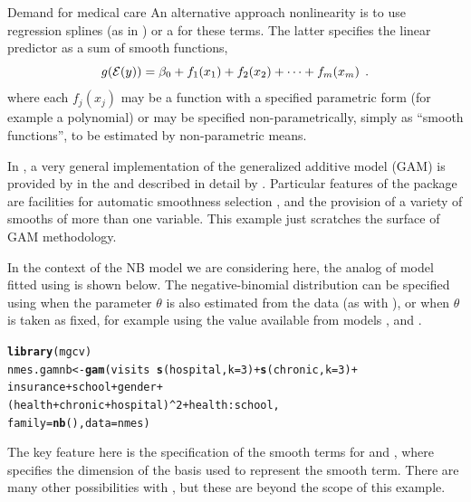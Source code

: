 \documentclass[11pt]{book}\usepackage[]{graphicx}\usepackage[]{color}
\makeatletter
\newcommand{\hlnum}[1]{\textcolor[rgb]{0.686,0.059,0.569}{#1}}%
\newcommand{\hlopt}[1]{\textcolor[rgb]{0,0,0}{#1}}%
\newcommand{\hlstd}[1]{\textcolor[rgb]{0.345,0.345,0.345}{#1}}%
\newcommand{\hlkwb}[1]{\textcolor[rgb]{0.69,0.353,0.396}{#1}}%
\newcommand{\hlkwc}[1]{\textcolor[rgb]{0.333,0.667,0.333}{#1}}%
\newcommand{\hlkwd}[1]{\textcolor[rgb]{0.737,0.353,0.396}{\textbf{#1}}}%
\newenvironment{kframe}{%
 \def\at@end@of@kframe{}%
 \ifinner\ifhmode%
  \def\at@end@of@kframe{\end{minipage}}%
  \begin{minipage}{\columnwidth}%
 \fi\fi%
 \def\FrameCommand##1{\hskip\@totalleftmargin \hskip-\fboxsep
 \colorbox{shadecolor}{##1}\hskip-\fboxsep
     \hskip-\linewidth \hskip-\@totalleftmargin \hskip\columnwidth}%
 \MakeFramed {\advance\hsize-\width
   \@totalleftmargin\z@ \linewidth\hsize
   \@setminipage}}%
 {\par\unskip\endMakeFramed%
 \at@end@of@kframe}
\newenvironment{knitrout}{}{} %
\renewenvironment{knitrout}{\small\renewcommand{\baselinestretch}{.85}}{} %
\makeatother
\begin{document}
\begin{Example}[nmes3]{Demand for medical care}
An alternative approach nonlinearity is to use
regression splines
(as in ) or a  \citep{HastieTibshirani:1990}
for these terms.  The latter specifies the linear predictor as a sum of
smooth functions,
\begin{equation*}
g(\mathcal{E}(y))=\beta_0 + f_1(x_1) + f_2(x_2)+ \cdots + f_m(x_m) \:\: .
\end{equation*}
where each $f_j(x_j)$
may be a function with a specified parametric form (for example a polynomial)
or may be specified non-parametrically, simply as ``smooth functions'', to be estimated by non-parametric means.

In \R, a very general implementation of the generalized additive model (GAM) is provided by
 in the  and described in detail by \citet{Wood:2006}.
Particular features of the package are facilities for automatic smoothness selection \citep{Wood:2004},
and the provision of a variety of smooths of more than one variable. This example just
scratches the surface of GAM methodology.

In the context of the NB model we are considering here, the analog of model 
fitted using  is  shown below.  The negative-binomial distribution
can be specified using  when the parameter $\theta$ is also estimated from
the data (as with ), or  when $\theta$ is taken as
fixed,
for example using
the value  available from models , and .
\begin{knitrout}
\color{fgcolor}\begin{kframe}
\begin{alltt}
\hlkwd{library}\hlstd{(mgcv)}
\hlstd{nmes.gamnb} \hlkwb{<-} \hlkwd{gam}\hlstd{(visits} \hlopt{~} \hlkwd{s}\hlstd{(hospital,} \hlkwc{k}\hlstd{=}\hlnum{3}\hlstd{)} \hlopt{+} \hlkwd{s}\hlstd{(chronic,} \hlkwc{k}\hlstd{=}\hlnum{3}\hlstd{)} \hlopt{+}
                           \hlstd{insurance} \hlopt{+} \hlstd{school} \hlopt{+} \hlstd{gender} \hlopt{+}
                           \hlstd{(health}\hlopt{+}\hlstd{chronic}\hlopt{+}\hlstd{hospital)}\hlopt{^}\hlnum{2} \hlopt{+} \hlstd{health}\hlopt{:}\hlstd{school,}
                  \hlkwc{family}\hlstd{=}\hlkwd{nb}\hlstd{(),} \hlkwc{data} \hlstd{= nmes)}
\end{alltt}
\end{kframe}
\end{knitrout}
The key feature here is the specification of the smooth terms for 
and , where  specifies
the dimension of the basis used to represent the smooth term.  There are many other
possibilities with , but these are beyond the scope of this example.


\end{Example}
\end{document}
